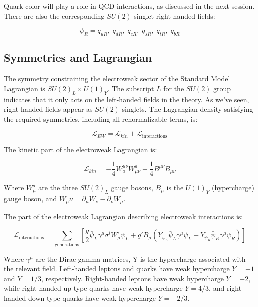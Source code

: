 Quark color will play a role in QCD interactions, as discussed in the next session.
There are also the corresponding $SU(2)$-singlet right-handed fields:

\begin{equation}\label{eq:right_handed_quarks}
\psi_R = q_{uR},\; q_{dR},\; q_{cR},\; q_{sR},\; q_{tR},\; q_{bR}
\end{equation}

\subsection{Symmetries and Lagrangian}\label{subsec:ew_lagrangian}
The symmetry constraining the electroweak sector of the Standard Model Lagrangian is $SU(2)_L \times U(1)_Y$.
The subscript $L$ for the $SU(2)$ group indicates that it only acts on the left-handed fields in the theory.
As we've seen, right-handed fields appear as $SU(2)$ singlets.
The Lagrangian density satisfying the required symmetries, including all renormalizable terms, is:

\begin{equation}\label{eq:ew_lagrangian}
    \mathcal{L}_{EW} = \mathcal{L}_{kin} + \mathcal{L}_{\text{interactions}}
\end{equation}

The kinetic part of the electroweak Lagrangian is:

\begin{equation}\label{eq:ew_kin}
    \mathcal{L}_{kin} = -\frac{1}{4}W^{\mu \nu}_{a}W_{\mu \nu}^{a}-\frac{1}{4}B^{\mu \nu}B_{\mu \nu}
\end{equation}

Where $W_\mu^a$ are the three $SU(2)_L$ gauge bosons, $B_\mu$ is the $U(1)_Y$ (hypercharge) gauge boson,
and $W_\mu\nu = \partial_{\mu} W_{\nu} - \partial_{\nu} W_{\mu}$.

The part of the electroweak Lagrangian describing electroweak interactions is:

\begin{equation}\label{eq:ew_int}
    \mathcal{L}_{\text{interactions}} = \sum_{\text{generations}}\left[\frac{g}{2}\bar{\psi}_{L}\gamma^\mu\sigma^i W_\mu^i \psi_L+
    g'B_\mu\left(Y_{\psi_L}\bar{\psi}_L\gamma^\mu\psi_L + Y_{\psi_R}\bar{\psi}_R\gamma^\mu \psi_R\right)\right]
\end{equation}

Where $\gamma^\mu$ are the Dirac gamma matrices, Y is the hypercharge associated with the relevant field.
Left-handed leptons and quarks have weak hypercharge $Y = -1$ and $Y = 1/3$, respectively.
Right-handed leptons have weak hypercharge $Y = -2$, while right-handed up-type quarks have weak hypercharge $Y = 4/3$,
and right-handed down-type quarks have weak hypercharge $Y = -2/3$.

